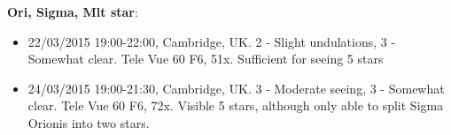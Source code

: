 {\bf Ori, Sigma, Mlt star}:
\begin{itemize}
\item 22/03/2015 19:00-22:00, Cambridge, UK. 2 - Slight undulations, 3 - Somewhat clear. Tele Vue 60 F6, 51x. Sufficient for seeing 5 stars
\item 24/03/2015 19:00-21:30, Cambridge, UK. 3 - Moderate seeing, 3 - Somewhat clear. Tele Vue 60 F6, 72x. Visible 5 stars, although only able to split Sigma Orionis into two stars.
\end{itemize}
